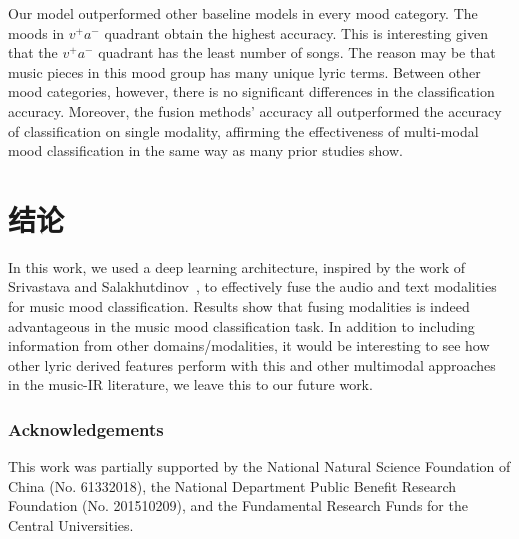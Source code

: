 \documentclass{llncs}
\begin{document}
Our model outperformed other baseline models in every mood category. The moods in $v^{+}a^{-}$ quadrant obtain the highest accuracy. This is interesting given that the $v^{+}a^{-}$ quadrant has the least number of songs. The reason may be that music pieces in this mood group has many unique lyric terms. Between other mood categories, however, there is no significant differences in the classification accuracy. Moreover, the fusion methods' accuracy all outperformed the accuracy of classification on single modality, affirming the effectiveness of multi-modal mood classification in the same way as many prior studies show.


\section{结论}%
In this work, we used a deep learning architecture, inspired by the work of Srivastava and Salakhutdinov~\cite{DBLP:journals/jmlr/SrivastavaS14}, to effectively fuse the audio and text modalities for music mood classification. 
Results show that fusing modalities is indeed advantageous in the music mood classification task. In addition to including information from other domains/modalities, it would be interesting to see how other lyric derived features perform with this and other multimodal approaches in the music-IR literature, we leave this to our future work.

\subsubsection*{Acknowledgements}
This work was partially supported by the National Natural Science Foundation of China (No. 61332018), the National Department Public Benefit Research Foundation (No. 201510209), and the Fundamental Research Funds for the Central Universities.


%

	
\end{document}
